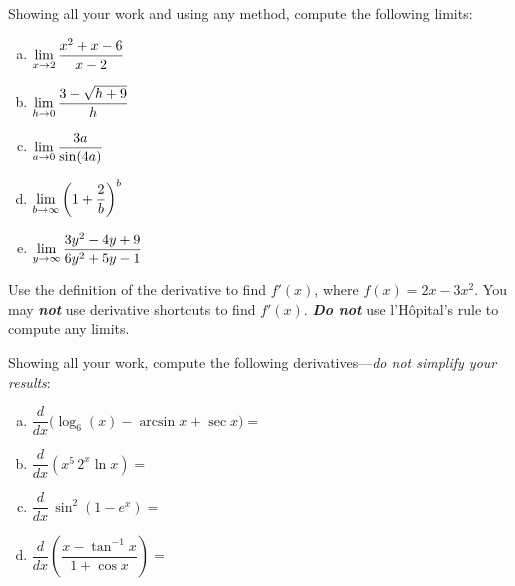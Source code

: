 \documentclass[12pt,letterpaper]{exam}
\begin{document}
\begin{questions}

\newpage
{} \par\vspace{0.3cm}

Showing all your work and using any method, compute the following limits: \par\vspace{0.2cm}
	\begin{enumerate}[(a)]
	\item $\displaystyle\lim_{x \to 2} \dfrac{x^2 + x - 6}{x - 2}$ \vfill
	\item $\displaystyle\lim_{h \to 0} \dfrac{3 - \sqrt{h + 9}}{h}$ \vfill
	\item $\displaystyle\lim_{a \to 0} \dfrac{3a}{\sin(4a)}$ \vfill
	
	\newpage
	
	\item $\displaystyle\lim_{b \to \infty} \left(1 + \dfrac{2}{b} \right)^b$ \vfill
	\item $\displaystyle\lim_{y \to \infty} \dfrac{3y^2 - 4y + 9}{6y^2 + 5y - 1}$ \vfill
	\end{enumerate}



\newpage
{} \par\vspace{0.3cm}

Use the definition of the derivative to find $f'(x)$, where $f(x)= 2x - 3x^2$. You may \textit{\textbf{not}} use derivative shortcuts to find $f'(x)$. \textit{\textbf{Do not}} use l'H\^opital's rule to compute any limits.



\newpage
{} \par\vspace{0.3cm}

Showing all your work, compute the following derivatives---\textit{do not simplify your results}:
	\begin{enumerate}[(a)]
	\item $\dfrac{d}{dx} \big( \log_6(x) - \arcsin x + \sec x \big)=$ \vfill
	\item $\dfrac{d}{dx} \left(x^5 \, 2^x \ln x \right)=$ \vfill
	\item $\dfrac{d}{dx}\, \sin^2(1 - e^x)=$ \vfill
	\item $\dfrac{d}{dx} \left( \dfrac{x - \tan^{-1} x}{1 + \cos x} \right)=$ \vfill
	\end{enumerate}




\end{questions}
\end{document}
